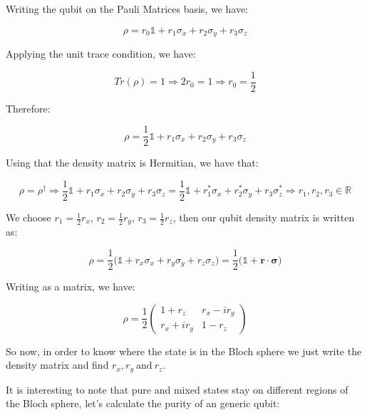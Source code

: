 Writing the qubit on the Pauli Matrices basis, we have:

\begin{equation}
    \rho = r_0 \mathds{1} + r_1 \sigma_x + r_2 \sigma_y + r_3 \sigma_z
\end{equation}

Applying the unit trace condition, we have:

\begin{equation}
    Tr(\rho) = 1 \Rightarrow 2 r_0 = 1 \Rightarrow r_0 = \frac{1}{2}
\end{equation}

Therefore:

\begin{equation}
    \rho = \frac{1}{2} \mathds{1} + r_1 \sigma_x + r_2 \sigma_y + r_3 \sigma_z
\end{equation}

Using that the density matrix is Hermitian, we have that:

\begin{equation}
    \rho = \rho^{\dagger} \Rightarrow \frac{1}{2} \mathds{1} + r_1 \sigma_x + r_2 \sigma_y + r_3 \sigma_z = \frac{1}{2} \mathds{1} + r_1^* \sigma_x + r_2^* \sigma_y + r_3 \sigma_z^* \Rightarrow r_1,r_2,r_3 \in \mathds{R}
\end{equation}

We choose $r_1 = \frac{1}{2} r_x$, $r_2 = \frac{1}{2} r_y$, $r_3 = \frac{1}{2} r_z$, then our qubit density matrix is written as: 

\begin{equation}
    \label{Eq: Qubit Density Matrix}
    \rho = \frac{1}{2} \bigg( \mathds{1} + r_x \sigma_x + r_y \sigma_y + r_z \sigma_z \bigg) = \frac{1}{2} \bigg( \mathds{1} + \mathbf{r} \cdot \mathbf{\sigma} \bigg)
\end{equation}

Writing as a matrix, we have:

\begin{equation}
    \rho = \frac{1}{2} \begin{pmatrix}
    1 + r_z & r_x - i r_y \\
    r_x + i r_y & 1 - r_z
    \end{pmatrix}
\end{equation}

So now, in order to know where the state is in the Bloch sphere we just write the density matrix and find $r_x,r_y \ \mathrm{and} \ r_z $. 

It is interesting to note that pure and mixed states stay on different regions of the Bloch sphere, let's calculate the purity of an generic qubit:

